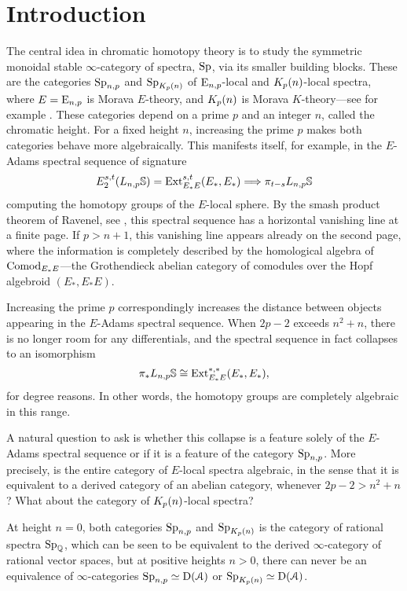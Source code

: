 

\section{Introduction}
\label{ch1:sec:introduction}

The central idea in chromatic homotopy theory is to study the symmetric monoidal stable $\infty$-category of spectra, $\mathrm{Sp}$, via its smaller building blocks. These are the categories $\mathrm{Sp}_{n,p}$ and $\mathrm{Sp}_{{K_p(n)}}$ of ${\mathrm{E}_{n,p}}$-local and ${K_p(n)}$-local spectra, where $E={\mathrm{E}_{n,p}}$ is Morava $E$-theory, and ${K_p(n)}$ is Morava $K$-theory---see for example \cite{hovey-strickland_99}. These categories depend on a prime $p$ and an integer $n$, called the chromatic height. For a fixed height $n$, increasing the prime $p$ makes both categories behave more algebraically. This manifests itself, for example, in the $E$-Adams spectral sequence of signature
\[E^{s,t}_2 (L_{n,p}\mathbb{S}) = \operatorname{Ext}_{E_*E}^{s,t}(E_*,E_*)\Longrightarrow \pi_{t-s} L_{n,p}\mathbb{S}\]
computing the homotopy groups of the $E$-local sphere. By the smash product theorem of Ravenel, see \cite[7.5.6]{ravenel_92}, this spectral sequence has a horizontal vanishing line at a finite page. If $p>n+1$, this vanishing line appears already on the second page, where the information is completely described by the homological algebra of $\mathrm{Comod}_{E_*E}$---the Grothendieck abelian category of comodules over the Hopf algebroid $(E_*, E_*E)$. 

Increasing the prime $p$ correspondingly increases the distance between objects appearing in the $E$-Adams spectral sequence. When $2p-2$ exceeds $n^2+n$, there is no longer room for any differentials, and the  spectral sequence in fact collapses to an isomorphism
\[\pi_* L_{n,p}\mathbb{S}\cong \operatorname{Ext}^{*,*}_{E_*E}(E_*, E_*),\]
for degree reasons. In other words, the homotopy groups are completely algebraic in this range. 

A natural question to ask is whether this collapse is a feature solely of the $E$-Adams spectral sequence or if it is a feature of the category $\mathrm{Sp}_{n,p}$. More precisely, is the entire category of $E$-local spectra algebraic, in the sense that it is equivalent to a derived category of an abelian category, whenever $2p-2>n^2+n$? What about the category of ${K_p(n)}$-local spectra?

At height $n=0$, both categories $\mathrm{Sp}_{n,p}$ and $\mathrm{Sp}_{{K_p(n)}}$ is the category of rational spectra $\mathrm{Sp}_{\mathbb{Q}}$, which can be seen to be equivalent to the derived $\infty$-category of rational vector spaces, but at positive heights $n>0$, there can never be an equivalence of $\infty$-categories $\mathrm{Sp}_{n,p} \simeq \mathrm{D}(\EuScript{A})$ or $\mathrm{Sp}_{{K_p(n)}} \simeq \mathrm{D}(\EuScript{A})$. 

